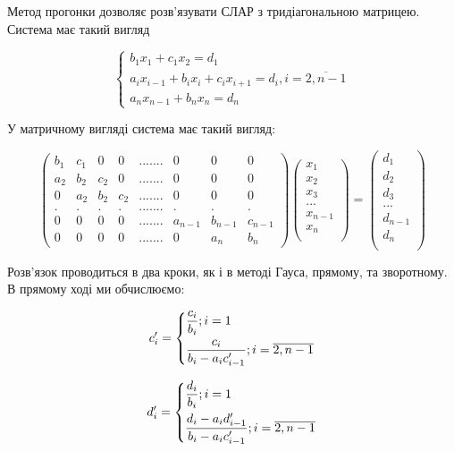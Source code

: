 \documentclass[a4paper, 12pt]{article}
\begin{document}
Метод прогонки дозволяє розв'язувати СЛАР з тридіагональною матрицею. Система має такий вигляд

\[
\begin{cases}
b_1x_1 + c_1x_2 = d_1 \\
a_ix_{i-1} + b_ix_i + c_ix_{i+1} = d_i, i = \overline{2, n-1} \\
a_nx_{n-1} + b_nx_n = d_n
\end{cases}
\]

У матричному вигляді система має такий вигляд:

\[
\begin{pmatrix}
b_1 & c_1 & 0 & 0 & ....... & 0 & 0 & 0 \\
a_2 & b_2 & c_2 & 0 & ....... & 0 & 0 & 0 \\
0 & a_2 & b_2 & c_2 & ....... & 0 & 0 & 0 \\
. & . & . & . & ....... & . & . & .\\
0 & 0 & 0 & 0 & ....... & a_{n-1} & b_{n-1} & c_{n-1}  \\
0 & 0 & 0 & 0 & ....... & 0 & a_{n} & b_{n}
\end{pmatrix}
\begin{pmatrix}
x_1 \\
x_2 \\
x_3 \\
... \\
x_{n-1} \\
x_n \\
\end{pmatrix}
=
\begin{pmatrix}
d_1 \\
d_2 \\
d_3 \\
... \\
d_{n-1} \\
d_n \\
\end{pmatrix}
\]

Розв'язок проводиться в два кроки, як і в методі Гауса, прямому, та зворотному. В прямому ході ми обчислюємо:

\[
c_i^\prime = 
\begin{dcases}
\frac{c_i}{b_i}; i = 1\\
\frac{c_i}{b_i-a_ic_{i-1}^\prime}; i = \overline{2,n-1}
\end{dcases}
\]

\[
d_i^\prime = 
\begin{dcases}
\frac{d_i}{b_i}; i = 1\\
\frac{d_i-a_id_{i-1}^\prime}{b_i-a_ic_{i-1}^\prime}; i = \overline{2,n-1}
\end{dcases}
\]
\end{document}
